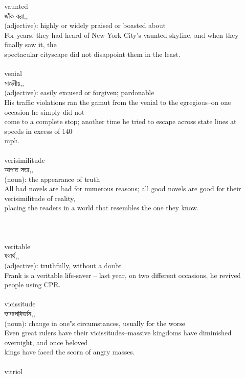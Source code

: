 \documentclass{article}
\begin{document}
{{vaunted}\\
{জাঁক করা,,}\\
{(adjective): highly or widely praised or boasted about\\For years, they had heard of New York City's vaunted skyline, and when they finally saw it, the\\spectacular cityscape did not disappoint them in the least.\\}\\
{venial}\\
{মার্জনীয়,,}\\
{(adjective): easily excused or forgiven; pardonable\\His traffic violations ran the gamut from the venial to the egregious--on one occasion he simply did not\\come to a complete stop; another time he tried to escape across state lines at speeds in excess of 140\\mph.\\}\\
{verisimilitude}\\
{আপাত সত্য,,}\\
{(noun): the appearance of truth\\All bad novels are bad for numerous reasons; all good novels are good for their verisimilitude of reality,\\placing the readers in a world that resembles the one they know.\\\\                                                                                  \\}\\
{veritable}\\
{যথার্থ,,}\\
{(adjective): truthfully, without a doubt\\Frank is a veritable life-saver -- last year, on two different occasions, he revived people using CPR.\\}\\
{vicissitude}\\
{ভাগ্যপরিবর্তন,,}\\
{(noun): change in one"s circumstances, usually for the worse\\Even great rulers have their vicissitudes--massive kingdoms have diminished overnight, and once beloved\\kings have faced the scorn of angry masses.\\}\\
{vitriol}\\
}
\end{document}
